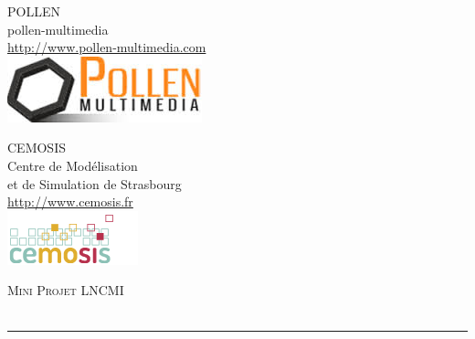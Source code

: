 \documentclass[a4paper,11pt]{article}   %
\begin{document}
\begin{titlepage}
\thispagestyle{empty}
 \vspace{-10mm}
   \begin{minipage}[c][150pt][c]{.40\linewidth} %
	{\normalsize 
		\begin{flushleft}
		\vspace{3mm}
	      	POLLEN\\
		pollen-multimedia\\
		\url{http://www.pollen-multimedia.com}\\
		\vspace{2mm}
		\includegraphics[scale=0.6]{Images/pollen.jpg} 
		\vspace{3mm}
		\end{flushleft}
	}
   \end{minipage}
\hfill
\hspace{15mm}
%
   \begin{minipage}[c][150pt][c]{.50\linewidth} %
	{\normalsize 
		\begin{flushright}
		\vspace{3mm}
			      	CEMOSIS\\
		Centre de Modélisation \\
		et de Simulation de Strasbourg\\
		\url{http://www.cemosis.fr}\\
		\vspace{2mm}
		\includegraphics[scale=0.8]{Images/cemosis.png} 
		\vspace{3mm}
		\end{flushright}
	}
   \end{minipage}
\vfill
\vspace{25mm}

    \hspace{3.5cm}   
   {\Huge \textsc{Mini Projet LNCMI\\}} \\
    \vspace{1mm}
\rule{\linewidth}{0.8mm}\\
     

\end{titlepage}
\end{document}
